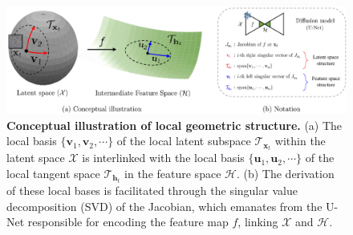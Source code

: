 \begin{figure}[!t]
    \centering
    \includegraphics[width=1\linewidth]{figure/teaser_rebuttal_3.pdf}
    \caption{\textbf{Conceptual illustration of local geometric structure.} 
    (a) The local basis $\{\mathbf{v}_1, \mathbf{v}_2, \cdots \}$ of the local latent subspace $\mathcal{T}_{{\mathbf{x}}_t}$ within the latent space $\mathcal{X}$ is interlinked with the local basis $\{\mathbf{u}_1, \mathbf{u}_2, \cdots\}$ of the local tangent space $\mathcal{T}_{{\mathbf{h}}_t}$ in the feature space $\mathcal{H}$.
    (b) The derivation of these local bases is facilitated through the singular value decomposition (SVD) of the Jacobian, which emanates from the U-Net responsible for encoding the feature map \(f\), linking \(\mathcal{X}\) and \(\mathcal{H}\).
    }
    \vspace{-1em}
    \label{fig:teaser}
\end{figure}



